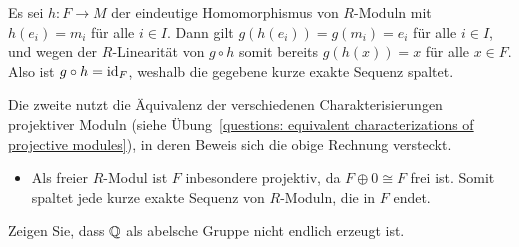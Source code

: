 \begin{solution}
\begin{enumerate}
\begin{itemize}
          Es sei $h \colon F \to M$ der eindeutige Homomorphismus von $R$-Moduln mit $h(e_i) = m_i$ für alle $i \in I$.
          Dann gilt $g(h(e_i)) = g(m_i) = e_i$ für alle $i \in I$, und wegen der $R$-Linearität von $g \circ h$ somit bereits $g(h(x)) = x$ für alle $x \in F$.
          Also ist $g \circ h = \operatorname{id}_F$, weshalb die gegebene kurze exakte Sequenz spaltet.
      \end{itemize}
      Die zweite nutzt die Äquivalenz der verschiedenen Charakterisierungen projektiver Moduln (siehe Übung~\ref{questions: equivalent characterizations of projective modules}), in deren Beweis sich die obige Rechnung versteckt.
      \begin{itemize}[resume]
        \item
          Als freier $R$-Modul ist $F$ inbesondere projektiv, da $F \oplus 0 \cong F$ frei ist.
          Somit spaltet jede kurze exakte Sequenz von $R$-Moduln, die in $F$ endet.
      \end{itemize}
  \end{enumerate}
\end{solution}


\begin{question}[subtitle = $\Rational$ ist nicht endlich erzeugt]
  \label{question: Q is not finitely generated}
  Zeigen Sie, dass $\Rational$ als abelsche Gruppe nicht endlich erzeugt ist.
\end{question}


